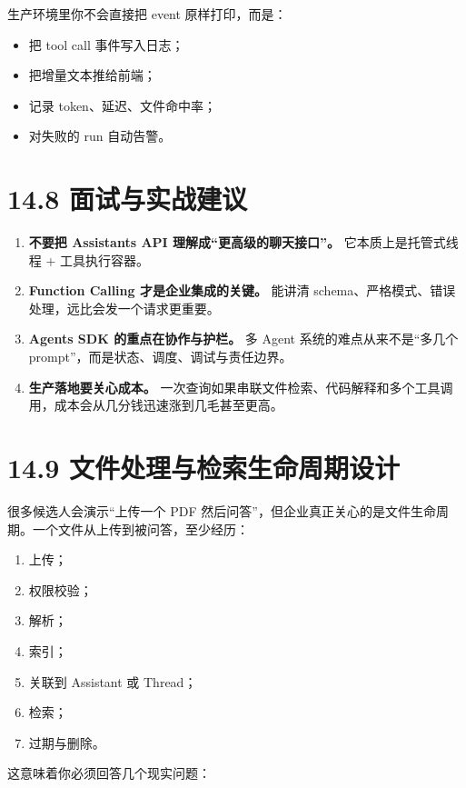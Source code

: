 生产环境里你不会直接把 event 原样打印，而是：


\begin{itemize}[leftmargin=2em]
\item 把 tool call 事件写入日志；
\item 把增量文本推给前端；
\item 记录 token、延迟、文件命中率；
\item 对失败的 run 自动告警。
\end{itemize}

\section{14.8 面试与实战建议}

\begin{enumerate}[leftmargin=2em]
\item \textbf{不要把 Assistants API 理解成``更高级的聊天接口''。} 它本质上是托管式线程 + 工具执行容器。
\item \textbf{Function Calling 才是企业集成的关键。} 能讲清 schema、严格模式、错误处理，远比会发一个请求更重要。
\item \textbf{Agents SDK 的重点在协作与护栏。} 多 Agent 系统的难点从来不是``多几个 prompt''，而是状态、调度、调试与责任边界。
\item \textbf{生产落地要关心成本。} 一次查询如果串联文件检索、代码解释和多个工具调用，成本会从几分钱迅速涨到几毛甚至更高。
\end{enumerate}

\section{14.9 文件处理与检索生命周期设计}

很多候选人会演示``上传一个 PDF 然后问答''，但企业真正关心的是文件生命周期。一个文件从上传到被问答，至少经历：


\begin{enumerate}[leftmargin=2em]
\item 上传；
\item 权限校验；
\item 解析；
\item 索引；
\item 关联到 Assistant 或 Thread；
\item 检索；
\item 过期与删除。
\end{enumerate}

这意味着你必须回答几个现实问题：


